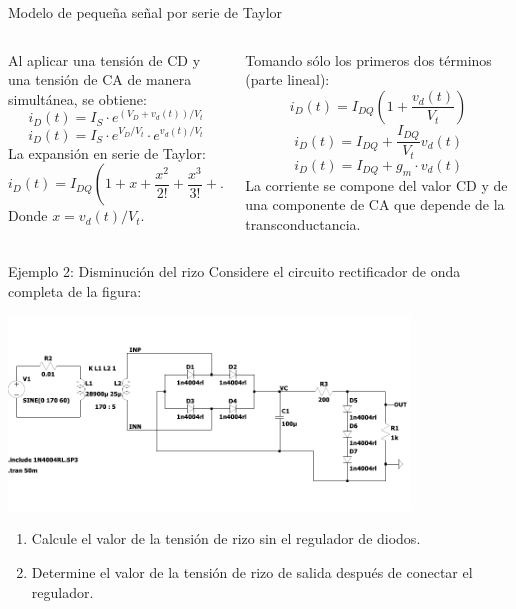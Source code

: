 \documentclass[t,aspectratio=169]{beamer}
\begin{document}
\begin{frame}{Modelo de pequeña señal por serie de Taylor}
\begin{columns}
\begin{column}{0.5\textwidth}
    Al aplicar una tensión de CD y una tensión de CA de manera simultánea, se obtiene:
    \[ i_D(t) = I_S \cdot e^{(V_D+v_d(t))/V_t} \]
    \[ i_D(t) = I_S \cdot e^{V_D/V_t} \cdot e^{v_d(t)/V_t} \]
    La expansión en serie de Taylor:
    \[ i_D(t) = I_{DQ} \left( 1 + x + \dfrac{x^2}{2!} + \dfrac{x^3}{3!} + ... \right) \]
    Donde $x = v_d(t)/V_t$.
\end{column}
\begin{column}{0.5\textwidth}
    Tomando sólo los primeros dos términos (parte lineal):
    \[ i_D(t) = I_{DQ} \left(1 + \dfrac{v_d(t)}{V_t}\right) \]
    \[ i_D(t) = I_{DQ} + \dfrac{I_{DQ}}{V_t} v_d(t) \]
    \[ i_D(t) = I_{DQ} + g_m \cdot v_d(t) \]
    La corriente se compone del valor CD y de una componente de CA que depende de la transconductancia.
\end{column}
\end{columns}
\end{frame}


\begin{frame}{Ejemplo 2: Disminución del rizo}
Considere el circuito rectificador de onda completa de la figura:

\includegraphics[width=0.8\textwidth]{figures/fullwave_rectifier_schematic.pdf}

\begin{enumerate}
    \item Calcule el valor de la tensión de rizo sin el regulador de diodos.
    \item Determine el valor de la tensión de rizo de salida después de conectar el regulador.
\end{enumerate}

\end{frame}
\end{document}

